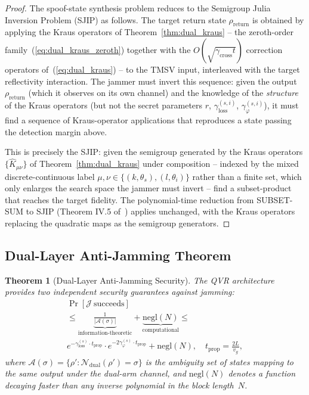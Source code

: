 \documentclass[journal]{IEEEtran}
\newtheorem{theorem}{Theorem}
\begin{document}
\begin{proof}
The spoof-state synthesis problem reduces to the Semigroup Julia Inversion Problem (SJIP) as follows. The target return state $\rho_{\text{return}}$ is obtained by applying the Kraus operators of Theorem~\ref{thm:dual_kraus} -- the zeroth-order family~(\ref{eq:dual_kraus_zeroth}) together with the $O(\sqrt{\gamma_{\text{cross}}t})$ correction operators of~(\ref{eq:dual_kraus}) -- to the TMSV input, interleaved with the target reflectivity interaction. The jammer must invert this sequence: given the output $\rho_{\text{return}}$ (which it observes on its own channel) and the knowledge of the \textit{structure} of the Kraus operators (but not the secret parameters $r$, $\gamma_{\text{loss}}^{(s,i)}$, $\gamma_\varphi^{(s,i)}$), it must find a sequence of Kraus-operator applications that reproduces a state passing the detection margin above.

This is precisely the SJIP: given the semigroup generated by the Kraus operators $\{\hat{K}_{\mu\nu}\}$ of Theorem~\ref{thm:dual_kraus} under composition -- indexed by the mixed discrete-continuous label $\mu,\nu\in\{(k,\theta_s),(l,\theta_i)\}$ rather than a finite set, which only enlarges the search space the jammer must invert -- find a subset-product that reaches the target fidelity. The polynomial-time reduction from SUBSET-SUM to SJIP (Theorem IV.5 of~\cite{gautum2024rigorous}) applies unchanged, with the Kraus operators replacing the quadratic maps as the semigroup generators.
\end{proof}

\subsection{Dual-Layer Anti-Jamming Theorem}

\begin{theorem}[Dual-Layer Anti-Jamming Security]\label{thm:dual_anti_jamming}
The QVR architecture provides two independent security guarantees against jamming:
\begin{equation}\label{eq:dual_security}
\begin{gathered}
\Pr[\mathcal{J}\ \text{succeeds}]\\ \leq \underbrace{\frac{1}{|\mathcal{A}(\sigma)|}}_{\text{information-theoretic}} + \underbrace{\text{negl}(N)}_{\text{computational}} \leq \\e^{-\gamma_{\text{loss}}^{(s)} \cdot t_{\text{prop}}} \cdot e^{-2\gamma_\varphi^{(s)} \cdot t_{\text{prop}}} + \text{negl}(N), \quad t_{\text{prop}}=\frac{2L}{v_g},
\end{gathered}
\end{equation}
where $\mathcal{A}(\sigma) = \{\rho' : \mathcal{N}_{\text{dual}}(\rho') = \sigma\}$ is the ambiguity set of states mapping to the same output under the dual-arm channel, and $\text{negl}(N)$ denotes a function decaying faster than any inverse polynomial in the block length~$N$.
\end{theorem}
\end{document}
